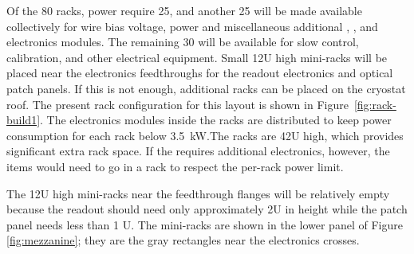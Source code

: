 
Of the 80 racks,   power require \num{25}, and another 25 will be made available collectively for   wire bias voltage,  power and miscellaneous additional , , and   electronics modules. The remaining 30 will be available for slow control, calibration, and other electrical equipment. Small 12U high mini-racks will  be placed near the electronics feedthroughs for the  readout electronics and optical patch panels. If this is not enough, additional racks can be placed on the cryostat roof. The present rack configuration for this layout is shown in Figure~\ref{fig:rack-build1}. 
 The electronics modules inside the racks are distributed to keep power consumption for each rack below \SI{3.5}{kW}.The racks are 42U high, which provides significant extra rack space.  If the  requires additional electronics, however, the items would need to go in a  rack to respect the per-rack power limit.

The 12U high mini-racks near the feedthrough flanges will be relatively empty because the  readout should need only approximately 2U in height while the  patch panel needs less than 1 U. The mini-racks are shown in the lower panel of Figure \ref{fig:mezzanine}; %
they are the gray rectangles near the electronics crosses.

